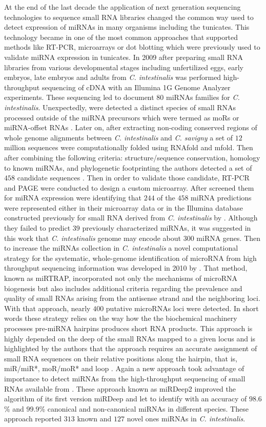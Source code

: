 \documentclass[graybox]{svmult}
\begin{document}
At the end of the last decade the application of next generation sequencing technologies to sequence small RNA libraries changed the common way used to detect expression of miRNAs in many organisms including the tunicates. This technology became in one of the most common approaches that supported methods like RT-PCR, microarrays or dot blotting which were previously used to validate miRNA expression in tunicates. In 2009 after preparing small RNA libraries from various developmental stages including unfertilized eggs, early
embryos, late embryos and adults from  \textit{C. intestinalis} was performed high-throughput sequencing of cDNA with an Illumina 1G Genome Analyzer experiments. These sequencing led to document $80$ miRNAs families for  \textit{C. intestinalis}. Unexpectedly, were detected a distinct species of small RNAs processed outside of the miRNA precursors which were termed as moRs or miRNA-offset RNAs \cite{Shi2009}. Later on, after extracting non-coding conserved regions of whole genome alignments between  \textit{C. intestinalis} and \textit{C. savigny} a set of $12$ million sequences were computationally folded using RNAfold and mfold. Then after combining the following criteria: structure/sequence conservation, homology to known miRNAs, and phylogenetic footprinting the authors detected 
a set of $458$ candidate sequences \cite{Keshavan2010}. Then in order to validate those candidate, RT-PCR and PAGE were conducted to design a custom microarray. After screened them for miRNA expression were identifying that $244$ of the $458$ miRNA predictions were represented either in their microarray data or in the Illumina database constructed previously for small RNA derived from \textit{C. intestinalis} by \cite{Shi2009}. Although they failed to predict $39$ previously characterized miRNAs, it was suggested in this work that \textit{C. intestinalis} genome may encode about $300$ miRNA genes. Then to increase the miRNAs collection in \textit{C. intestinalis} a novel computational strategy for the systematic, whole-genome identification of microRNA from high throughput sequencing information was developed in 2010 by \cite{Hendrix2010}. That method, known as miRTRAP, incorporated not only the mechanisms of microRNA biogenesis but also includes additional criteria regarding the prevalence and quality of small RNAs arising from the antisense strand and the neighboring loci. With that approach, nearly $400$ putative microRNAs loci were detected. In short words these strategy relies on the way how the the biochemical machinery processes pre-miRNA hairpins produces short RNA products. This approach is highly depended on the deep of the small RNAs mapped to a given locus and is highlighted by the authors that the approach requires an accurate assignment of small RNA sequences on their relative positions along the hairpin, that is, miR/miR*, moR/moR* and loop \cite{Hendrix2010}. Again a new approach took advantage of importance to detect miRNAs from the high-throughput sequencing of small RNAs available from \cite{Shi2009}. These approach known as  miRDeep2 improved the algorithm of its first version miRDeep \cite{Friedlander2012} and let to identify with an accuracy of $98.6$\% and $99.9$\% canonical and non-canonical miRNAs in different species. These approach reported $313$ known and $127$ novel ones miRNAs in \textit{C. intestinalis}. 
\end{document}
